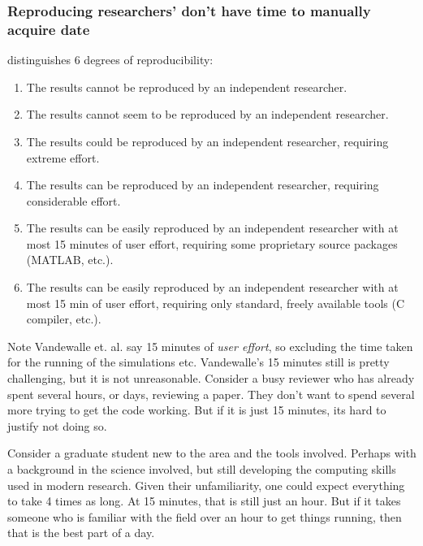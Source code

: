 \documentclass{jors}
\begin{document}
\subsubsection{Reproducing researchers' don't have time to manually acquire date}
\textcite{VabdewakkeReproduceableResearch} distinguishes 6 degrees of reproducibility:
\begin{enumerate}
	\addtocounter{enumi}{-1} %
	\item The results cannot be reproduced by an independent researcher.
	\item The results cannot seem to be reproduced by an independent researcher.
	\item The results could be reproduced by an independent researcher, requiring extreme effort. 
	\item The results can be reproduced by an independent researcher, requiring considerable effort.
	\item The results can be easily reproduced by an independent researcher with at most 15 minutes of user effort, requiring some proprietary source packages (MATLAB, etc.).
	\item The results can be easily reproduced by an independent researcher with at most 15 min of user effort, requiring only standard, freely available tools (C compiler, etc.).
\end{enumerate}
Note Vandewalle et. al. say 15 minutes of \emph{user effort}, so excluding the time taken for the running of the simulations etc.
Vandewalle's 15 minutes still is pretty challenging, but it is not unreasonable.
Consider a busy reviewer who has already spent several hours, or days, reviewing a paper.
They don't want to spend several more trying to get the code working.
But if it is just 15 minutes, its hard to justify not doing so.

Consider a graduate student new to the area and the tools involved.
Perhaps with a background in the science involved, but still developing the computing skills used in modern research.
Given their unfamiliarity, one could expect everything to take 4 times as long.
At 15 minutes, that is still just an hour.
But if it takes someone who is familiar with the field over an hour to get things running, then that is the best part of a day.
\end{document}
